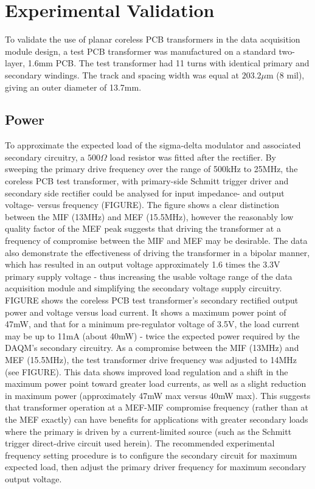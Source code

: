 \documentclass[conference]{IEEEtran}
\begin{document}
\section{Experimental Validation}
To validate the use of planar coreless PCB transformers in the data acquisition module design, a test PCB transformer was manufactured on a standard two-layer, 1.6mm PCB.  The test transformer had 11 turns with identical primary and secondary windings.  The track and spacing width was equal at $ 203.2\mu $m (8 mil), giving an outer diameter of 13.7mm.

	\subsection{Power}
	To approximate the expected load of the sigma-delta modulator and associated secondary circuitry, a $500\Omega $ load resistor was fitted after the rectifier.  By sweeping the primary drive frequency over the range of 500kHz to 25MHz, the coreless PCB test transformer, with primary-side Schmitt trigger driver and secondary side rectifier could be analysed for input impedance- and output voltage- versus frequency (FIGURE).  The figure shows a clear distinction between the MIF (13MHz) and MEF (15.5MHz), however the reasonably low quality factor of the MEF peak suggests that driving the transformer at a frequency of compromise between the MIF and MEF may be desirable.  The data also demonstrate the effectiveness of driving the transformer in a bipolar manner, which has resulted in an output voltage approximately 1.6 times the 3.3V primary supply voltage - thus increasing the usable voltage range of the data acquisition module and simplifying the secondary voltage supply circuitry.
	FIGURE shows the coreless PCB test transformer's secondary rectified output power and voltage versus load current.  It shows a maximum power point of 47mW, and that for a minimum pre-regulator voltage of 3.5V, the load current may be up to 11mA (about 40mW) - twice the expected power required by the DAQM's secondary circuitry.  
	As a compromise between the MIF (13MHz) and MEF (15.5MHz), the test transformer drive frequency was adjusted to 14MHz (see FIGURE).  This data shows improved load regulation and a shift in the maximum power point toward greater load currents, as well as a slight reduction in maximum power (approximately 47mW max versus 40mW max).  This suggests that transformer operation at a MEF-MIF compromise frequency (rather than at the MEF exactly) can have benefits for applications with greater secondary loads where the primary is driven by a current-limited source (such as the Schmitt trigger direct-drive circuit used herein).  The recommended experimental frequency setting procedure is to configure the secondary circuit for maximum expected load, then adjust the primary driver frequency for maximum secondary output voltage.
\end{document}
